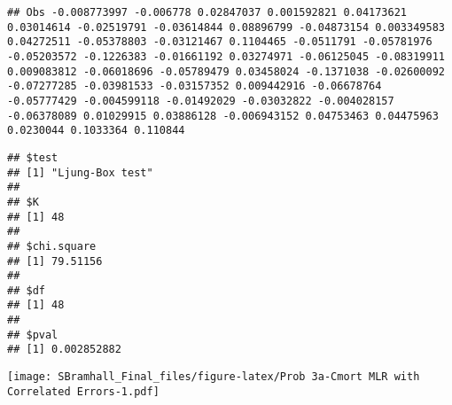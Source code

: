 \documentclass[]{article}
\newenvironment{Shaded}{\begin{snugshade}}{\end{snugshade}}
\newcommand{\KeywordTok}[1]{\textcolor[rgb]{0.13,0.29,0.53}{\textbf{#1}}}
\newcommand{\DataTypeTok}[1]{\textcolor[rgb]{0.13,0.29,0.53}{#1}}
\newcommand{\DecValTok}[1]{\textcolor[rgb]{0.00,0.00,0.81}{#1}}
\newcommand{\CommentTok}[1]{\textcolor[rgb]{0.56,0.35,0.01}{\textit{#1}}}
\newcommand{\OperatorTok}[1]{\textcolor[rgb]{0.81,0.36,0.00}{\textbf{#1}}}
\newcommand{\NormalTok}[1]{#1}
\begin{document}
\begin{Shaded}
\end{Shaded}

\begin{verbatim}
## Obs -0.008773997 -0.006778 0.02847037 0.001592821 0.04173621 0.03014614 -0.02519791 -0.03614844 0.08896799 -0.04873154 0.003349583 0.04272511 -0.05378803 -0.03121467 0.1104465 -0.0511791 -0.05781976 -0.05203572 -0.1226383 -0.01661192 0.03274971 -0.06125045 -0.08319911 0.009083812 -0.06018696 -0.05789479 0.03458024 -0.1371038 -0.02600092 -0.07277285 -0.03981533 -0.03157352 0.009442916 -0.06678764 -0.05777429 -0.004599118 -0.01492029 -0.03032822 -0.004028157 -0.06378089 0.01029915 0.03886128 -0.006943152 0.04753463 0.04475963 0.0230044 0.1033364 0.110844
\end{verbatim}

\begin{verbatim}
## $test
## [1] "Ljung-Box test"
## 
## $K
## [1] 48
## 
## $chi.square
## [1] 79.51156
## 
## $df
## [1] 48
## 
## $pval
## [1] 0.002852882
\end{verbatim}

\begin{Shaded}
\end{Shaded}

\texttt{[image: SBramhall\_Final\_files/figure-latex/Prob 3a-Cmort MLR with Correlated Errors-1.pdf]}
\end{document}
